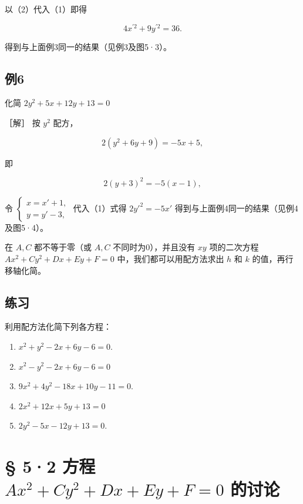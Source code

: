 以（2）代入（1）即得

\[
4 x^{\prime 2} + 9 y^{\prime 2} = 36.
\]

得到与上面例3同一的结果（见例3及图5·3）。

\subsection{例6}\label{ux4f8b6-5}

化简 \(2y^{2} + 5x + 12y + 13 = 0\)

［解］ 按 \(y^{2}\) 配方，

\[
2 (y^{2} + 6 y + 9) = - 5 x + 5,
\]

即

\[
2 (y + 3) ^ {2} = - 5 (x - 1), \tag {1}
\]

令
\(\left\{ \begin{array}{l} x = x' + 1, \\ y = y' - 3, \end{array} \right.\)
代入（1）式得 \(2y'^{2} = -5x'\)
得到与上面例4同一的结果（见例4及图5·4）。

在 \(A, C\) 都不等于零（或 \(A, C\) 不同时为0），并且没有 \(xy\)
项的二次方程 \(Ax^2 + Cy^2 + Dx + Ey + F = 0\)
中，我们都可以用配方法求出 \(h\) 和 \(k\) 的值，再行移轴化简。

\subsection{练习}\label{ux7ec3ux4e60-13}

利用配方法化简下列各方程：

\begin{enumerate}
\def\labelenumi{\arabic{enumi}.}
\item
  \(x^{2} + y^{2} - 2x + 6y - 6 = 0.\)
\item
  \(x^{2} - y^{2} - 2x + 6y - 6 = 0\)
\item
  \(9x^{2} + 4y^{2} - 18x + 10y - 11 = 0.\)
\item
  \(2x^{2} + 12x + 5y + 13 = 0\)
\item
  \(2y^{2} - 5x - 12y + 13 = 0.\)
\end{enumerate}

\section{\texorpdfstring{§ 5·2 方程
\(Ax^{2} + Cy^{2} + Dx + Ey + F = 0\)
的讨论}{§ 5·2 方程 Ax\^{}\{2\} + Cy\^{}\{2\} + Dx + Ey + F = 0 的讨论}}\label{ux65b9ux7a0b-ax2-cy2-dx-ey-f-0-ux7684ux8ba8ux8bba}

